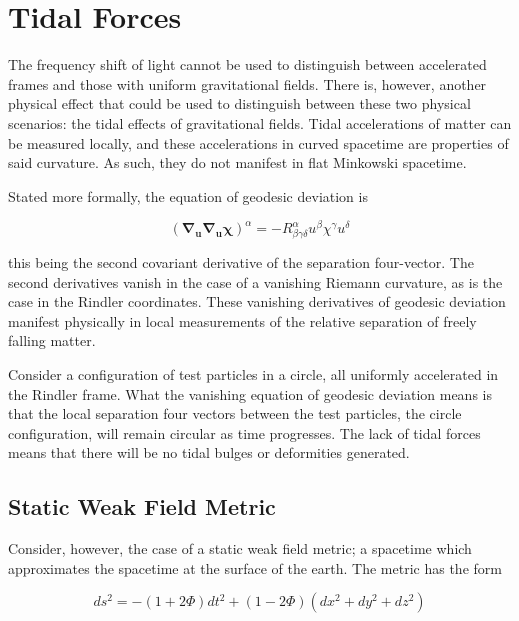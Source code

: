 \documentclass[11pt]{article}
\begin{document}
\section{Tidal Forces}

The frequency shift of light cannot be used to distinguish between accelerated frames and those with uniform gravitational fields. There is, however, another physical effect that could be used to distinguish between these two physical scenarios: the tidal effects of gravitational fields. Tidal accelerations of matter can be measured locally, and these accelerations in curved spacetime are properties of said curvature. As such, they do not manifest in flat Minkowski spacetime.

Stated more formally, the equation of geodesic deviation is

\begin{equation}
    \boldsymbol{(\nabla_{\boldsymbol{u}} \nabla_{\boldsymbol{u}} \chi)}^{\alpha} = -R^{\alpha} _{\beta \gamma \delta} u^{\beta} \chi^{\gamma} u^{\delta}
\end{equation}

this being the second covariant derivative of the separation four-vector. The second derivatives vanish in the case of a vanishing Riemann curvature, as is the case in the Rindler coordinates. These vanishing derivatives of geodesic deviation manifest physically in local measurements of the relative separation of freely falling matter. 

Consider a configuration of test particles in a circle, all uniformly accelerated in the Rindler frame. What the vanishing equation of geodesic deviation means is that the local separation four vectors between the test particles, the circle configuration, will remain circular as time progresses. The lack of tidal forces means that there will be no tidal bulges or deformities generated. 

\subsection{Static Weak Field Metric}
Consider, however, the case of a static weak field metric; a spacetime which approximates the spacetime at the surface of the earth. The metric has the form

\begin{equation}
    \label{static-weak-field}
    ds^2 = -(1 + 2 \Phi) dt^2 + (1 - 2 \Phi)(dx^2 + dy^2 + dz^2)
\end{equation}
\end{document}
